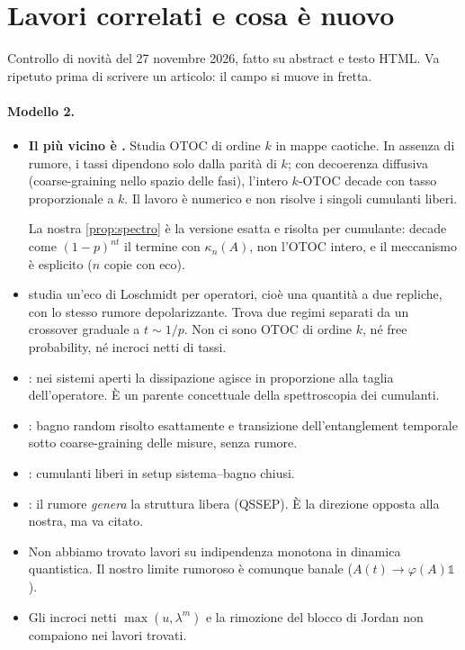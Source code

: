 \section{Lavori correlati e cosa è nuovo}\label{sec:related}
Controllo di novità del 27 novembre 2026, fatto su abstract e testo HTML. Va ripetuto prima di scrivere un articolo: il campo si muove in fretta.

\paragraph{Modello 2.}
\begin{itemize}[leftmargin=1.5em]
\item \textbf{Il più vicino è \cite{GGW26}.} Studia OTOC di ordine $k$ in mappe caotiche. In assenza di rumore, i tassi dipendono solo dalla parità di $k$; con decoerenza diffusiva (coarse-graining nello spazio delle fasi), l'intero $k$-OTOC decade con tasso proporzionale a $k$. Il lavoro è numerico e non risolve i singoli cumulanti liberi.

  La nostra \cref{prop:spectro} è la versione esatta e risolta per cumulante: decade come $(1-p)^{nt}$ il termine con $\kappa_n(A)$, non l'OTOC intero, e il meccanismo è esplicito ($n$ copie con eco).
\item \textbf{\cite{YS25}} studia un'eco di Loschmidt per operatori, cioè una quantità a due repliche, con lo stesso rumore depolarizzante. Trova due regimi separati da un crossover graduale a $t\sim1/p$. Non ci sono OTOC di ordine $k$, né free probability, né incroci netti di tassi.
\item \textbf{\cite{SY23}}: nei sistemi aperti la dissipazione agisce in proporzione alla taglia dell'operatore. È un parente concettuale della spettroscopia dei cumulanti.
\item \textbf{\cite{VSHHLA25}}: bagno random risolto esattamente e transizione dell'entanglement temporale sotto coarse-graining delle misure, senza rumore.
\item \textbf{\cite{FGW25}}: cumulanti liberi in setup sistema--bagno chiusi.
\item \textbf{\cite{HB23}}: il rumore \emph{genera} la struttura libera (QSSEP). È la direzione opposta alla nostra, ma va citato.
\item Non abbiamo trovato lavori su indipendenza monotona in dinamica quantistica. Il nostro limite rumoroso è comunque banale ($A(t)\to\varphi(A)\mathbb 1$).
\item Gli incroci netti $\max(u,\lambda^m)$ e la rimozione del blocco di Jordan non compaiono nei lavori trovati.
\end{itemize}

